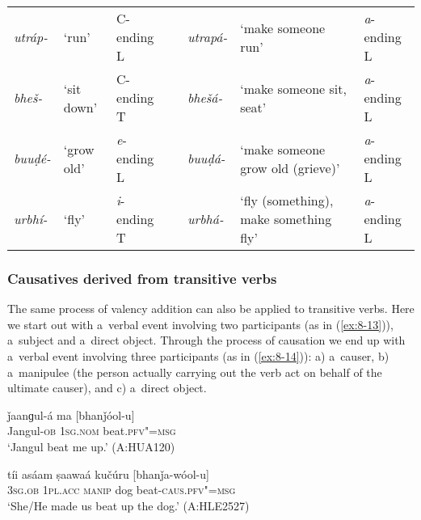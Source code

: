 \begin{table}[H]
\begin{tabularx}{\textwidth}{ l  P{10mm}  l  l  l  Q  l }

\textit{utráp-} &
`run' &
C-ending L &
\centering {\textgreater} &
\textit{utrapá-} &
`make someone run' &
\textit{a}-ending L\\
\textit{bheš-} &
`sit down' &
C-ending T &
\centering {\textgreater} &
\textit{bhešá-} &
`make someone sit, seat' &
\textit{a}-ending L\\
\textit{buuḍé-} &
`grow old' &
\textit{e}-ending L &
\centering {\textgreater}\par
&
\textit{buuḍá-} &
`make someone grow old (grieve)' &
\textit{a}-ending L\\
\textit{urbhí-} &
`fly'
&
{\textit{i}-ending T}
&
\centering {\textgreater}\par
&
\textit{urbhá-}
&
`fly (something), make something fly' &
{\textit{a}-ending L}
\\
\end{tabularx}
\end{table}

\subsubsection*{Causatives derived from transitive verbs}

The same process of valency addition can also be applied to transitive verbs. Here we start out with a~verbal event involving two participants (as in (\ref{ex:8-13})), a~subject and a~direct object. Through the process of causation we end up with a~verbal event involving three participants (as in (\ref{ex:8-14})): a) a~causer, b) a~manipulee (the person actually carrying out the verb act on behalf of the ultimate causer), and c) a~direct object.

\begin{exe}
\ex
\label{ex:8-13}
\gll ǰaanɡul-á ma [bhanǰóol-u] \\
Jangul-\textsc{ob} \textsc{1sg.nom} beat.\textsc{pfv"=msg} \\
\glt `Jangul beat me up.' (A:HUA120)
\end{exe}
\begin{exe}
\ex
\label{ex:8-14}
\gll tíi asáam ṣaawaá kučúru [bhanǰa-wóol-u] \\
\textsc{3sg.ob} \textsc{1pl.acc} \textsc{manip} dog beat-\textsc{caus.pfv"=msg} \\
\glt `She/He made us beat up the dog.' (A:HLE2527)
\end{exe}

